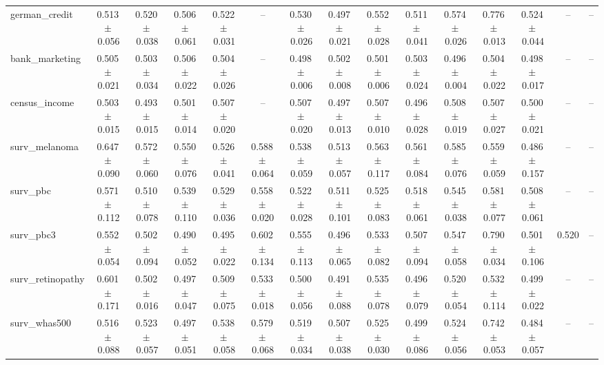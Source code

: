 \documentclass[8pt]{extarticle}
\begin{document}
\begin{longtable}{l*{14}{c}}
german\_credit & 0.513\,$\pm$\,0.056 & 0.520\,$\pm$\,0.038 & 0.506\,$\pm$\,0.061 & 0.522\,$\pm$\,0.031 & -- & 0.530\,$\pm$\,0.026 & 0.497\,$\pm$\,0.021 & 0.552\,$\pm$\,0.028 & 0.511\,$\pm$\,0.041 & 0.574\,$\pm$\,0.026 & 0.776\,$\pm$\,0.013 & 0.524\,$\pm$\,0.044 & -- & -- \\
bank\_marketing & 0.505\,$\pm$\,0.021 & 0.503\,$\pm$\,0.034 & 0.506\,$\pm$\,0.022 & 0.504\,$\pm$\,0.026 & -- & 0.498\,$\pm$\,0.006 & 0.502\,$\pm$\,0.008 & 0.501\,$\pm$\,0.006 & 0.503\,$\pm$\,0.024 & 0.496\,$\pm$\,0.004 & 0.504\,$\pm$\,0.022 & 0.498\,$\pm$\,0.017 & -- & -- \\
census\_income & 0.503\,$\pm$\,0.015 & 0.493\,$\pm$\,0.015 & 0.501\,$\pm$\,0.014 & 0.507\,$\pm$\,0.020 & -- & 0.507\,$\pm$\,0.020 & 0.497\,$\pm$\,0.013 & 0.507\,$\pm$\,0.010 & 0.496\,$\pm$\,0.028 & 0.508\,$\pm$\,0.019 & 0.507\,$\pm$\,0.027 & 0.500\,$\pm$\,0.021 & -- & -- \\
surv\_melanoma & 0.647\,$\pm$\,0.090 & 0.572\,$\pm$\,0.060 & 0.550\,$\pm$\,0.076 & 0.526\,$\pm$\,0.041 & 0.588\,$\pm$\,0.064 & 0.538\,$\pm$\,0.059 & 0.513\,$\pm$\,0.057 & 0.563\,$\pm$\,0.117 & 0.561\,$\pm$\,0.084 & 0.585\,$\pm$\,0.076 & 0.559\,$\pm$\,0.059 & 0.486\,$\pm$\,0.157 & -- & -- \\
surv\_pbc & 0.571\,$\pm$\,0.112 & 0.510\,$\pm$\,0.078 & 0.539\,$\pm$\,0.110 & 0.529\,$\pm$\,0.036 & 0.558\,$\pm$\,0.020 & 0.522\,$\pm$\,0.028 & 0.511\,$\pm$\,0.101 & 0.525\,$\pm$\,0.083 & 0.518\,$\pm$\,0.061 & 0.545\,$\pm$\,0.038 & 0.581\,$\pm$\,0.077 & 0.508\,$\pm$\,0.061 & -- & -- \\
surv\_pbc3 & 0.552\,$\pm$\,0.054 & 0.502\,$\pm$\,0.094 & 0.490\,$\pm$\,0.052 & 0.495\,$\pm$\,0.022 & 0.602\,$\pm$\,0.134 & 0.555\,$\pm$\,0.113 & 0.496\,$\pm$\,0.065 & 0.533\,$\pm$\,0.082 & 0.507\,$\pm$\,0.094 & 0.547\,$\pm$\,0.058 & 0.790\,$\pm$\,0.034 & 0.501\,$\pm$\,0.106 & 0.520 & -- \\
surv\_retinopathy & 0.601\,$\pm$\,0.171 & 0.502\,$\pm$\,0.016 & 0.497\,$\pm$\,0.047 & 0.509\,$\pm$\,0.075 & 0.533\,$\pm$\,0.018 & 0.500\,$\pm$\,0.056 & 0.491\,$\pm$\,0.088 & 0.535\,$\pm$\,0.078 & 0.496\,$\pm$\,0.079 & 0.520\,$\pm$\,0.054 & 0.532\,$\pm$\,0.114 & 0.499\,$\pm$\,0.022 & -- & -- \\
surv\_whas500 & 0.516\,$\pm$\,0.088 & 0.523\,$\pm$\,0.057 & 0.497\,$\pm$\,0.051 & 0.538\,$\pm$\,0.058 & 0.579\,$\pm$\,0.068 & 0.519\,$\pm$\,0.034 & 0.507\,$\pm$\,0.038 & 0.525\,$\pm$\,0.030 & 0.499\,$\pm$\,0.086 & 0.524\,$\pm$\,0.056 & 0.742\,$\pm$\,0.053 & 0.484\,$\pm$\,0.057 & -- & -- \\

\end{longtable}
\end{document}
